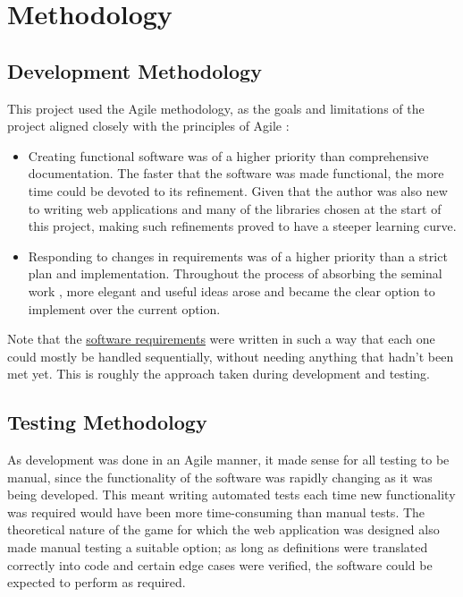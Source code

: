 \section{Methodology}

\subsection{Development Methodology}
This project used the Agile methodology, as the goals and limitations of the project aligned closely with the principles of Agile \cite{agilePrinciples}:
\begin{itemize}
    \item Creating functional software was of a higher priority than comprehensive documentation. The faster that the software was made functional, the more time could be devoted to its refinement. Given that the author was also new to writing web applications and many of the libraries chosen at the start of this project, making such refinements proved to have a steeper learning curve.
    \item Responding to changes in requirements was of a higher priority than a strict plan and implementation. Throughout the process of absorbing the seminal work \cite{chistikov2020re}, more elegant and useful ideas arose and became the clear option to implement over the current option.
\end{itemize}


Note that the \hyperref[softwareReqs]{software requirements} were written in such a way that each one could mostly be handled sequentially, without needing anything that hadn't been met yet. This is roughly the approach taken during development and testing. 

\subsection{Testing Methodology}
As development was done in an Agile manner, it made sense for all testing to be manual, since the functionality of the software was rapidly changing as it was being developed. This meant writing automated tests each time new functionality was required would have been more time-consuming than manual tests. The theoretical nature of the game for which the web application was designed also made manual testing a suitable option; as long as definitions were translated correctly into code and certain edge cases were verified, the software could be expected to perform as required.

